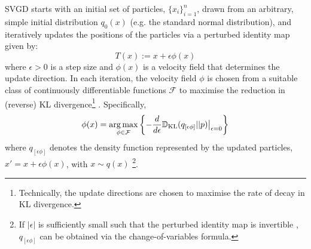 SVGD starts with an initial set of particles, $\{x_i\}_{i=1}^n$, drawn from an arbitrary, simple initial distribution $q_0(x)$ (e.g. the standard normal distribution), and iteratively updates the positions of the particles via a perturbed identity map \citep{liu_svgd} given by:
\renewcommand{\theequation}{2.19}
\begin{equation}
\label{eqn:phi_optim0}
T(x) := x + \epsilon \phi(x)
\end{equation}
where $\epsilon > 0$ is a step size and $\phi(x)$ is a velocity field that determines the update direction. In each iteration, the velocity field $\phi$ is chosen from a suitable class of continuously differentiable functions $\mathcal{F}$ to maximise the reduction in (reverse) KL divergence\footnote{Technically, the update directions are chosen to maximise the rate of decay in KL divergence.} \citep{liu_svgd_theory, liu_svgd}. Specifically, 
\renewcommand{\theequation}{2.20}
\begin{equation}
\label{eqn:2_20}
\phi(x) = \underset{\phi \in \mathcal{F}}{\operatorname*{arg\,max}} \left \{- \frac{d}{d \epsilon} \mathbb{D}_{\text{KL}}(q_{[\epsilon \phi]} || p) \big|_{\epsilon=0} \right \}
\end{equation}
where $q_{[\epsilon \phi]}$ denotes the density function represented by the updated particles, $x' = x + \epsilon \phi(x)$, with $x \sim q(x)$ \footnote{If $|\epsilon|$ is sufficiently small such that the perturbed identity map is invertible \citep{liu_svgd}, $q_{[\epsilon \phi]}$ can be obtained via the change-of-variables formula.}. 


